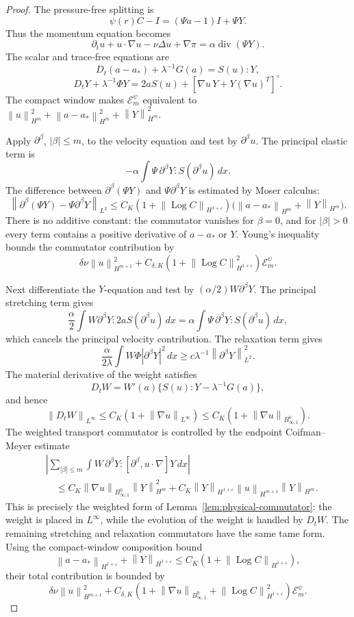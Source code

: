 \documentclass[11pt]{article}
\newcommand{\divv}{\operatorname{div}}
\newcommand{\Log}{\operatorname{Log}}
\newcommand{\calE}{\mathcal E}
\newcommand{\eps}{\varepsilon}
\newcommand{\norm}[1]{\left\lVert #1\right\rVert}
\newcommand{\Besov}{B^0_{\infty,1}}
\begin{document}
\begin{proof}
The pressure-free splitting is
\[
  \psi(r)C-I=(\Psi a-1)I+\Psi Y.
\]
Thus the momentum equation becomes
\[
  \partial_tu+u\cdot\nabla u-\nu\Delta u+\nabla\pi
  =\alpha\divv(\Psi Y).
\]
The scalar and trace-free equations are
\[
  D_t(a-a_*)+\lambda^{-1}G(a)=S(u):Y,
\]
\[
  D_tY+\lambda^{-1}\Phi Y
  =2aS(u)+[\nabla u\,Y+Y(\nabla u)^T]^\circ .
\]
The compact window makes \(\calE_m^\psi\) equivalent to
\(\norm{u}_{H^m}^2+\norm{a-a_*}_{H^m}^2+\norm{Y}_{H^m}^2\).

Apply \(\partial^\beta\), \(|\beta|\le m\), to the velocity equation and test
by \(\partial^\beta u\).  The principal elastic term is
\[
  -\alpha\int \Psi\,\partial^\beta Y:S(\partial^\beta u)\,dx .
\]
The difference between \(\partial^\beta(\Psi Y)\) and
\(\Psi\partial^\beta Y\) is estimated by Moser calculus:
\[
  \norm{\partial^\beta(\Psi Y)-\Psi\partial^\beta Y}_{L^2}
  \le C_K(1+\norm{\Log C}_{H^{1+\eps}})
  \bigl(\norm{a-a_*}_{H^m}+\norm{Y}_{H^m}\bigr).
\]
There is no additive constant: the commutator vanishes for \(\beta=0\), and
for \(|\beta|>0\) every term contains a positive derivative of \(a-a_*\) or
\(Y\).  Young's inequality bounds the commutator contribution by
\[
  \delta\nu\norm{u}_{H^{m+1}}^2
  +C_{\delta,K}(1+\norm{\Log C}_{H^{1+\eps}}^2)\calE_m^\psi .
\]

Next differentiate the \(Y\)-equation and test by
\((\alpha/2)W\partial^\beta Y\).  The principal stretching term gives
\[
  \frac{\alpha}{2}\int W\partial^\beta Y:2aS(\partial^\beta u)\,dx
  =
  \alpha\int \Psi\,\partial^\beta Y:S(\partial^\beta u)\,dx,
\]
which cancels the principal velocity contribution.  The relaxation term gives
\[
  \frac{\alpha}{2\lambda}\int W\Phi|\partial^\beta Y|^2\,dx
  \ge c\lambda^{-1}\norm{\partial^\beta Y}_{L^2}^2.
\]
The material derivative of the weight satisfies
\[
  D_tW=W'(a)\{S(u):Y-\lambda^{-1}G(a)\},
\]
and hence
\[
  \norm{D_tW}_{L^\infty}
  \le C_K(1+\norm{\nabla u}_{L^\infty})
  \le C_K(1+\norm{\nabla u}_{\Besov}).
\]
The weighted transport commutator is controlled by the endpoint
Coifman--Meyer estimate
\[
\begin{aligned}
  &\left|\sum_{|\beta|\le m}
  \int W\,\partial^\beta Y:[\partial^\beta,u\cdot\nabla]Y\,dx\right|\\
  &\quad\le
  C_K\norm{\nabla u}_{\Besov}\norm{Y}_{H^m}^2
  +C_K\norm{Y}_{H^{1+\eps}}\norm{u}_{H^{m+1}}\norm{Y}_{H^m}.
\end{aligned}
\]
This is precisely the weighted form of Lemma~\ref{lem:physical-commutator}:
the weight is placed in \(L^\infty\), while the evolution of the weight is
handled by \(D_tW\).  The remaining stretching and relaxation commutators have
the same tame form.  Using the compact-window composition bound
\[
  \norm{a-a_*}_{H^{1+\eps}}+\norm{Y}_{H^{1+\eps}}
  \le C_K(1+\norm{\Log C}_{H^{1+\eps}}),
\]
their total contribution is bounded by
\[
  \delta\nu\norm{u}_{H^{m+1}}^2
  +C_{\delta,K}(1+\norm{\nabla u}_{\Besov}
  +\norm{\Log C}_{H^{1+\eps}}^2)\calE_m^\psi .
\]


\end{proof}
\end{document}
